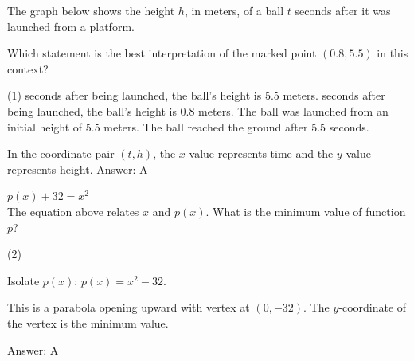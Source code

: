 \documentclass[11pt,paper=a4,answers]{exam}
\begin{document}
\begin{questions}
\vspace{1cm}
\question
The graph below shows the height $h$, in meters, of a ball $t$ seconds after it was launched from a platform.
\begin{center}
\end{center}
Which statement is the best interpretation of the marked point $(0.8, 5.5)$ in this context?
\begin{tasks}(1)
     seconds after being launched, the ball's height is 5.5 meters.
     seconds after being launched, the ball's height is 0.8 meters.
    \task The ball was launched from an initial height of 5.5 meters.
    \task The ball reached the ground after 5.5 seconds.
\end{tasks}

\begin{solution}
In the coordinate pair $(t, h)$, the $x$-value represents time and the $y$-value represents height.
\vspace{5pt}
Answer: \colorbox{yellow!100}{A}
\end{solution}

\vspace{1cm}

\question
$p(x) + 32 = x^2$ \\
The equation above relates $x$ and $p(x)$. What is the minimum value of function $p$?
\begin{tasks}(2)
       
\end{tasks}

\begin{solution}
Isolate $p(x)$: $p(x) = x^2 - 32$.
\vspace{5pt}
\begin{center}
This is a parabola opening upward with vertex at $(0, -32)$.
\vspace{5pt}
The $y$-coordinate of the vertex is the minimum value.
\end{center}
\vspace{5pt}
Answer: \colorbox{yellow!100}{A}
\end{solution}


\end{questions}
\end{document}
